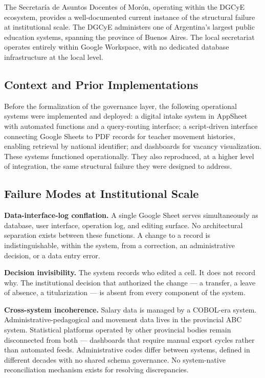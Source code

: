 \documentclass[conference]{IEEEtran}
\begin{document}
The Secretaría de Asuntos Docentes of Morón, operating within the DGCyE ecosystem, provides a well-documented current instance of the structural failure at institutional scale. The DGCyE administers one of Argentina's largest public education systems, spanning the province of Buenos Aires. The local secretariat operates entirely within Google Workspace, with no dedicated database infrastructure at the local level.

\subsection{Context and Prior Implementations}

Before the formalization of the governance layer, the following operational systems were implemented and deployed: a digital intake system in AppSheet with automated functions and a query-routing interface; a script-driven interface connecting Google Sheets to PDF records for teacher movement histories, enabling retrieval by national identifier; and dashboards for vacancy visualization. These systems functioned operationally. They also reproduced, at a higher level of integration, the same structural failure they were designed to address.

\subsection{Failure Modes at Institutional Scale}

\noindent\textbf{Data-interface-log conflation.} A single Google Sheet serves simultaneously as database, user interface, operation log, and editing surface. No architectural separation exists between these functions. A change to a record is indistinguishable, within the system, from a correction, an administrative decision, or a data entry error.

\medskip
\noindent\textbf{Decision invisibility.} The system records who edited a cell. It does not record why. The institutional decision that authorized the change --- a transfer, a leave of absence, a titularization --- is absent from every component of the system.

\medskip
\noindent\textbf{Cross-system incoherence.} Salary data is managed by a COBOL-era system. Administrative-pedagogical and movement data lives in the provincial ABC system. Statistical platforms operated by other provincial bodies remain disconnected from both --- dashboards that require manual export cycles rather than automated feeds. Administrative codes differ between systems, defined in different decades with no shared schema governance. No system-native reconciliation mechanism exists for resolving discrepancies.
\end{document}
